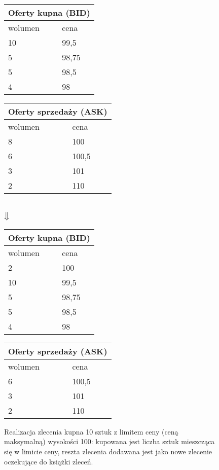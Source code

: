 \begin{figure}[ht]

\begin{center}
\parbox{.3\linewidth}{
\begin{tabular}{ |l|l| }
\hline
\multicolumn{2}{|c|}{Oferty kupna (BID)} \\
\hline
 \rowcolor{palegreen} wolumen & cena \\
\hline
 \rowcolor{palegreen} 10 & 99,5 \\
 \hline
  \rowcolor{palegreen} 5 & 98,75 \\
\hline
  \rowcolor{palegreen} 5 & 98,5 \\
\hline
  \rowcolor{palegreen} 4 & 98 \\
\hline
\end{tabular}}
\parbox{.3\linewidth}{
\begin{tabular}{ |l|l| }
\hline
 \multicolumn{2}{|c|}{Oferty sprzedaży (ASK)} \\
\hline
 \rowcolor{palered} wolumen & cena \\
\hline
 \rowcolor{lightgrey} 8 & 100 \\
 \hline
  \rowcolor{palered} 6 & 100,5 \\
\hline
  \rowcolor{palered} 3 & 101 \\
\hline
  \rowcolor{palered} 2 & 110 \\
\hline
\end{tabular}
}
\vspace{0.5cm}
\\$\big\Downarrow$
\end{center}

\begin{center}
\parbox{.3\linewidth}{
\begin{tabular}{ |l|l| }
\hline
\multicolumn{2}{|c|}{Oferty kupna (BID)} \\
\hline
 \rowcolor{palegreen} wolumen & cena \\
\hline
 \rowcolor{palegreen2} 2 & 100 \\
 \hline
 \rowcolor{palegreen} 10 & 99,5 \\
 \hline
  \rowcolor{palegreen} 5 & 98,75 \\
\hline
  \rowcolor{palegreen} 5 & 98,5 \\
\hline
  \rowcolor{palegreen} 4 & 98 \\
\hline
\end{tabular}}
\parbox{.3\linewidth}{
\begin{tabular}{ |l|l| }
\hline
 \multicolumn{2}{|c|}{Oferty sprzedaży (ASK)} \\
\hline
 \rowcolor{palered} wolumen & cena \\
\hline
  \rowcolor{palered} 6 & 100,5 \\
\hline
  \rowcolor{palered} 3 & 101 \\
\hline
  \rowcolor{palered} 2 & 110 \\
\hline
\end{tabular}
}
\end{center}
\caption{{Realizacja zlecenia kupna 10 sztuk z limitem ceny (ceną maksymalną) wysokości 100}: kupowana jest liczba sztuk mieszcząca się w limicie ceny, reszta zlecenia dodawana jest jako nowe zlecenie oczekujące do książki zleceń.} \label{orderbook_3}
\end{figure}
